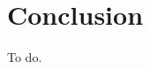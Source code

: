 \documentclass[../masters.tex]{subfiles}
\begin{document}
\graphicspath{{./imgs/}{../imgs/}} %

\section{Conclusion}
To do.

%
%
\end{document}
